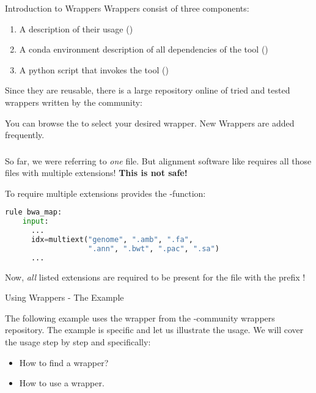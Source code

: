 \begin{frame}{Introduction to Wrappers}
    Wrappers consist of three components:
    \begin{enumerate}
        \item A description of their usage ()
        \item A conda environment description of all dependencies of the tool ()
        \item A python script that invokes the tool ()
    \end{enumerate}
    Since they are reusable, there is a large repository online of tried and tested 
    wrappers written by the community:
    \pause
    \begin{docs}
    	You can browse the  to select your desired wrapper. New Wrappers are added frequently.
    \end{docs}
\end{frame}

\begin{frame}[fragile]
	\frametitle{}
	\begin{warning}
		So far, we were referring to \emph{one} file. But alignment software like  requires all those files with multiple extensions! {\bf This is not safe!}
	\end{warning}
    To require multiple extensions \Snakemake provides the -function:
    \begin{lstlisting}[language=Python,style=Python]
rule bwa_map:
    input:
      ...
      idx=multiext("genome", ".amb", ".fa",
                   ".ann", ".bwt", ".pac", ".sa")
      ...
    \end{lstlisting}
	Now, \emph{all} listed extensions are required to be present for the file with the prefix !
\end{frame}



\begin{frame}[fragile]{Using Wrappers - The Example}
	\begin{docs}
		The following example uses the  wrapper from the \Snakemake-community wrappers repository. The example is specific and let us illustrate the usage.
		We will cover the usage step by step and specifically:
		\begin{itemize}
			\item How to find a wrapper?
			\item How to use a wrapper.
		\end{itemize}
	\end{docs}
\end{frame}

